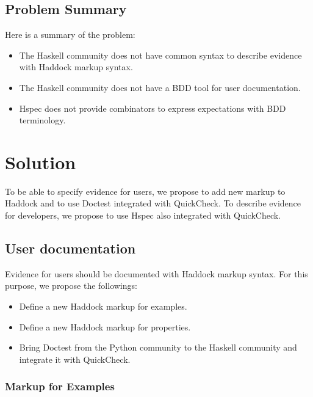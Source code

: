 \documentclass[preprint]{sigplanconf}
\begin{document}
\subsection{Problem Summary}

Here is a summary of the problem:

\begin{itemize}
\item
    The Haskell community does not have common syntax to describe
    evidence with Haddock markup syntax.
\item
    The Haskell community does not have a BDD tool for user documentation.
\item
    Hspec does not provide combinators to express expectations with
    BDD terminology.
\end{itemize}

\section{Solution}

To be able to specify evidence for users, we propose to add new
markup to Haddock and to use Doctest integrated with QuickCheck. To
describe evidence for developers, we propose to use Hspec also
integrated with QuickCheck.

\subsection{User documentation}
\label{sec:user-doc}

Evidence for users should be documented with Haddock markup syntax.
For this purpose, we propose the followings:

\begin{itemize}
\item Define a new Haddock markup for examples.
\item Define a new Haddock markup for properties.
\item Bring Doctest from the Python community to the Haskell
community and integrate it with QuickCheck.
\end{itemize}

\subsubsection{Markup for Examples}
\end{document}
